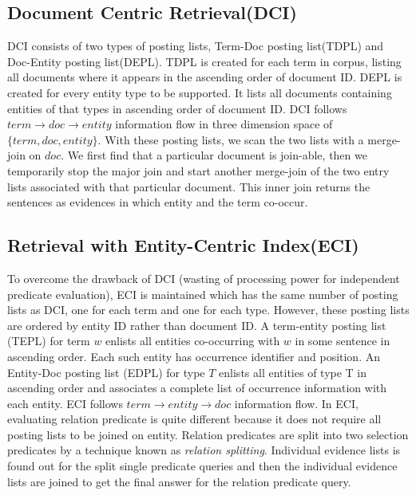 \documentclass[11pt]{report}
\begin{document}
\subsection{Document Centric Retrieval(DCI)}
DCI consists of two types of posting lists, Term-Doc posting list(TDPL) and Doc-Entity posting list(DEPL).
TDPL is created for each term in corpus, listing all documents where it appears in the ascending order of document ID.
DEPL is created for every entity type to be supported. It lists all documents containing entities of that types in 
ascending order of document ID. DCI follows $term \rightarrow doc \rightarrow entity$ information flow in three
dimension space of $\{term, doc, entity\}$. With these posting lists, we scan the two lists with a merge-join on $doc$.
We first find that a particular document is join-able, then we temporarily stop the major join and start another merge-join of the two 
entry lists associated with that particular document. This inner join returns the sentences as evidences in which
entity and the term co-occur.

\subsection{Retrieval with Entity-Centric Index(ECI)}
To overcome the drawback of DCI (wasting of processing power for independent predicate evaluation), ECI is maintained which
has the same number of posting lists as DCI, one for each term and one for each type. However, these posting lists are 
ordered by entity ID rather than document ID. A term-entity posting list (TEPL) for term $w$ enlists all entities 
co-occurring with $w$ in some sentence in ascending order. Each such entity has occurrence identifier and position.
An Entity-Doc posting list (EDPL) for type $T$ enlists all entities of type T in ascending order and associates a complete 
list of occurrence information with each entity. ECI follows $term \rightarrow entity \rightarrow doc$ information flow.
In ECI, evaluating relation predicate is quite different because it does not require all posting lists to be joined on entity.
Relation predicates are split into two selection predicates by a technique known as \textit{relation splitting}.
Individual evidence lists is found out for the split single predicate queries and then the individual evidence lists are joined
to get the final answer for the relation predicate query.\\

\end{document}
